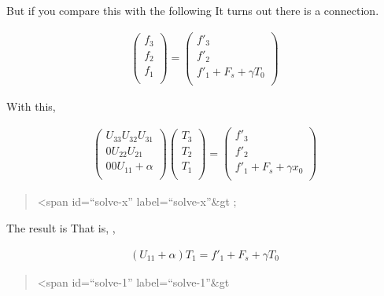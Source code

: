 But if you compare this with the following It turns out there is a
connection.

\begin{eqnarray}
  \left( \begin{array}{l}
         f_3 \\ f_2 \\ f_1 \\
         \end{array} \right)
 =
  \left( \begin{array}{l}
         f'_3 \\ f'_2 \\ f'_1 + F_s + \gamma T_0 \\
         \end{array} \right)
\end{eqnarray}

With this,

\begin{eqnarray}
  \left( \begin{array}{lll}
         U_{33}  U_{32}  U_{31} \\
         0       U_{22}  U_{21} \\
         0       0       U_{11} + \alpha \\
         \end{array} \right)
  \left( \begin{array}{l}
         T_3 \\ T_2 \\ T_1 \\
         \end{array} \right)
  =
  \left(  \begin{array}{l}
          f'_3 \\ f'_2 \\ f'_1 + F_s + \gamma x_0 \\
          \end{array} \right)
\end{eqnarray}

\begin{quote}
\textless span id=``solve-x'' label=``solve-x''\&gt ;
\end{quote}

The result is That is, ,

\begin{eqnarray}
  ( U_{11} +  \alpha  ) T_1 = f'_1 + F_s + \gamma T_0
\end{eqnarray}

\begin{quote}
\textless span id=``solve-1'' label=``solve-1''\&gt
\end{quote}

